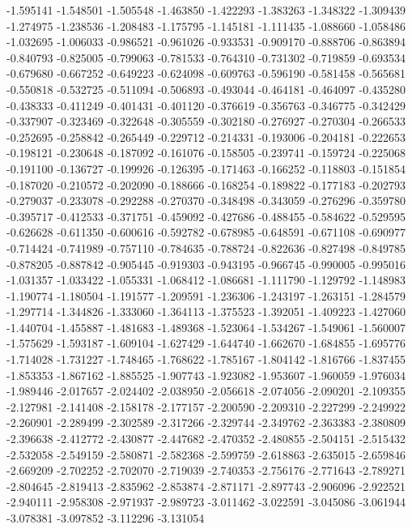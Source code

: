 -1.595141
-1.548501
-1.505548
-1.463850
-1.422293
-1.383263
-1.348322
-1.309439
-1.274975
-1.238536
-1.208483
-1.175795
-1.145181
-1.111435
-1.088660
-1.058486
-1.032695
-1.006033
-0.986521
-0.961026
-0.933531
-0.909170
-0.888706
-0.863894
-0.840793
-0.825005
-0.799063
-0.781533
-0.764310
-0.731302
-0.719859
-0.693534
-0.679680
-0.667252
-0.649223
-0.624098
-0.609763
-0.596190
-0.581458
-0.565681
-0.550818
-0.532725
-0.511094
-0.506893
-0.493044
-0.464181
-0.464097
-0.435280
-0.438333
-0.411249
-0.401431
-0.401120
-0.376619
-0.356763
-0.346775
-0.342429
-0.337907
-0.323469
-0.322648
-0.305559
-0.302180
-0.276927
-0.270304
-0.266533
-0.252695
-0.258842
-0.265449
-0.229712
-0.214331
-0.193006
-0.204181
-0.222653
-0.198121
-0.230648
-0.187092
-0.161076
-0.158505
-0.239741
-0.159724
-0.225068
-0.191100
-0.136727
-0.199926
-0.126395
-0.171463
-0.166252
-0.118803
-0.151854
-0.187020
-0.210572
-0.202090
-0.188666
-0.168254
-0.189822
-0.177183
-0.202793
-0.279037
-0.233078
-0.292288
-0.270370
-0.348498
-0.343059
-0.276296
-0.359780
-0.395717
-0.412533
-0.371751
-0.459092
-0.427686
-0.488455
-0.584622
-0.529595
-0.626628
-0.611350
-0.600616
-0.592782
-0.678985
-0.648591
-0.671108
-0.690977
-0.714424
-0.741989
-0.757110
-0.784635
-0.788724
-0.822636
-0.827498
-0.849785
-0.878205
-0.887842
-0.905445
-0.919303
-0.943195
-0.966745
-0.990005
-0.995016
-1.031357
-1.033422
-1.055331
-1.068412
-1.086681
-1.111790
-1.129792
-1.148983
-1.190774
-1.180504
-1.191577
-1.209591
-1.236306
-1.243197
-1.263151
-1.284579
-1.297714
-1.344826
-1.333060
-1.364113
-1.375523
-1.392051
-1.409223
-1.427060
-1.440704
-1.455887
-1.481683
-1.489368
-1.523064
-1.534267
-1.549061
-1.560007
-1.575629
-1.593187
-1.609104
-1.627429
-1.644740
-1.662670
-1.684855
-1.695776
-1.714028
-1.731227
-1.748465
-1.768622
-1.785167
-1.804142
-1.816766
-1.837455
-1.853353
-1.867162
-1.885525
-1.907743
-1.923082
-1.953607
-1.960059
-1.976034
-1.989446
-2.017657
-2.024402
-2.038950
-2.056618
-2.074056
-2.090201
-2.109355
-2.127981
-2.141408
-2.158178
-2.177157
-2.200590
-2.209310
-2.227299
-2.249922
-2.260901
-2.289499
-2.302589
-2.317266
-2.329744
-2.349762
-2.363383
-2.380809
-2.396638
-2.412772
-2.430877
-2.447682
-2.470352
-2.480855
-2.504151
-2.515432
-2.532058
-2.549159
-2.580871
-2.582368
-2.599759
-2.618863
-2.635015
-2.659846
-2.669209
-2.702252
-2.702070
-2.719039
-2.740353
-2.756176
-2.771643
-2.789271
-2.804645
-2.819413
-2.835962
-2.853874
-2.871171
-2.897743
-2.906096
-2.922521
-2.940111
-2.958308
-2.971937
-2.989723
-3.011462
-3.022591
-3.045086
-3.061944
-3.078381
-3.097852
-3.112296
-3.131054
